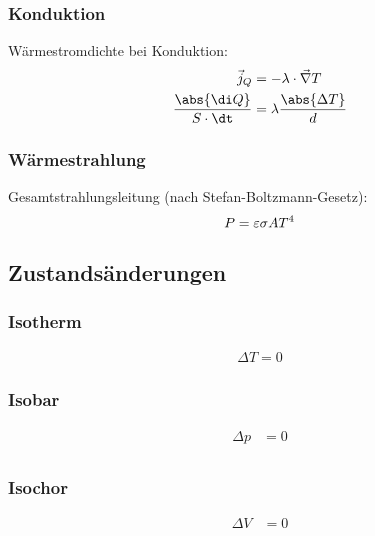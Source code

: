 \documentclass[11pt,letterpaper]{article}
\begin{document}
{{{    \subsubsection{Konduktion}
    {
        Wärmestromdichte bei Konduktion:
        \begin{align*}
            \vec{j}_Q &= -\lambda\cdot \vec{\nabla}T\\
            \frac{\abs{\di Q}}{S\cdot \dt} &= \lambda \frac{\abs{\Delta T}}{d}
        \end{align*}
    }
    \subsubsection{Wärmestrahlung}
    {
        Gesamtstrahlungsleitung (nach Stefan-Boltzmann-Gesetz):
        \begin{equation*}
            P = \varepsilon \sigma A T^4\\
        \end{equation*}
    }
}

\subsection{Zustandsänderungen}
{
    \subsubsection{Isotherm}
    {
        \begin{align*}
            \Delta T = 0
        \end{align*}
    }
    \subsubsection{Isobar}
    {
        \begin{align*}
            \Delta p &= 0\\
        \end{align*}
    }
    \subsubsection{Isochor}
    {
        \begin{align*}
            \Delta V &= 0 \\
        \end{align*}
    }
}}}
\end{document}
